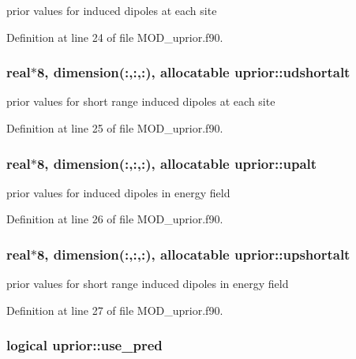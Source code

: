 prior values for induced dipoles at each site 



Definition at line 24 of file M\-O\-D\-\_\-uprior.\-f90.

\hypertarget{classuprior_a63f7d61fa4654ee2cd7460514deb2040}{
\subsubsection[{udshortalt}]{\setlength{\rightskip}{0pt plus 5cm}real$\ast$8, dimension(\-:,\-:,\-:), allocatable uprior\-::udshortalt}}\label{classuprior_a63f7d61fa4654ee2cd7460514deb2040}


prior values for short range induced dipoles at each site 



Definition at line 25 of file M\-O\-D\-\_\-uprior.\-f90.

\hypertarget{classuprior_ae50156ff52a0b156355471f9935a3e21}{
\subsubsection[{upalt}]{\setlength{\rightskip}{0pt plus 5cm}real$\ast$8, dimension(\-:,\-:,\-:), allocatable uprior\-::upalt}}\label{classuprior_ae50156ff52a0b156355471f9935a3e21}


prior values for induced dipoles in energy field 



Definition at line 26 of file M\-O\-D\-\_\-uprior.\-f90.

\hypertarget{classuprior_ab1763d53b72fde72ed327e0f3f639f7a}{
\subsubsection[{upshortalt}]{\setlength{\rightskip}{0pt plus 5cm}real$\ast$8, dimension(\-:,\-:,\-:), allocatable uprior\-::upshortalt}}\label{classuprior_ab1763d53b72fde72ed327e0f3f639f7a}


prior values for short range induced dipoles in energy field 



Definition at line 27 of file M\-O\-D\-\_\-uprior.\-f90.

\hypertarget{classuprior_a368331c2d6701085f91aefbec9f727d8}{
\subsubsection[{use\-\_\-pred}]{\setlength{\rightskip}{0pt plus 5cm}logical uprior\-::use\-\_\-pred}}\label{classuprior_a368331c2d6701085f91aefbec9f727d8}


